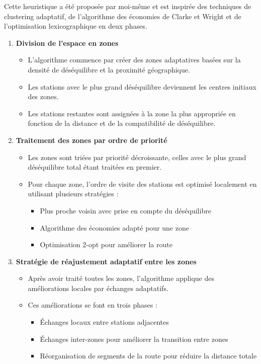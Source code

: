 \documentclass{article}
\begin{document}
Cette heuristique a été proposée par moi-même et est inspirée des techniques de clustering adaptatif, de l’algorithme des économies de Clarke et Wright et de l’optimisation lexicographique en deux phases.

\begin{enumerate}
  \item \textbf{Division de l'espace en zones}
    \begin{itemize}
      \item L'algorithme commence par créer des zones adaptatives basées sur la densité de déséquilibre et la proximité géographique.
      \item Les stations avec le plus grand déséquilibre deviennent les centres initiaux des zones.
      \item Les stations restantes sont assignées à la zone la plus appropriée en fonction de la distance et de la compatibilité de déséquilibre.
    \end{itemize}

  \item \textbf{Traitement des zones par ordre de priorité}
    \begin{itemize}
      \item Les zones sont triées par priorité décroissante, celles avec le plus grand déséquilibre total étant traitées en premier.
      \item Pour chaque zone, l'ordre de visite des stations est optimisé localement en utilisant plusieurs stratégies :
        \begin{itemize}
          \item Plus proche voisin avec prise en compte du déséquilibre
          \item Algorithme des économies adapté pour une zone
          \item Optimisation 2-opt pour améliorer la route
        \end{itemize}
    \end{itemize}

  \item \textbf{Stratégie de réajustement adaptatif entre les zones}
    \begin{itemize}
      \item Après avoir traité toutes les zones, l'algorithme applique des améliorations locales par échanges adaptatifs.
      \item Ces améliorations se font en trois phases :
        \begin{itemize}
          \item Échanges locaux entre stations adjacentes
          \item Échanges inter-zones pour améliorer la transition entre zones
          \item Réorganisation de segments de la route pour réduire la distance totale
        \end{itemize}
    \end{itemize}


\end{enumerate}
\end{document}
